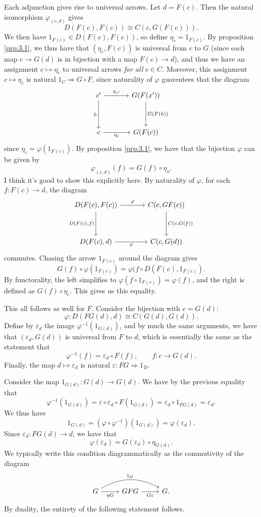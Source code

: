 Each adjunction gives rise to universal arrows. Let $d=F(c)$. Then the natural isomorphism $\varphi_{(c,d)} $ gives
\[
	D(F(c),F(c))\cong C(c,G(F(c)))
.\]
We then have $1_{F(c)} \in D(F(c),F(c))$, so define $\eta_c = 1_{F(c)} $. By proposition \ref{prp:3.1}, we thus have that $(\eta _c,F(c))$ is universal from $c$ to $G$ (since each map $c\to G(d)$ is in bijection with a map $F(c)\to d$), and thus we have an assignment $c\mapsto \eta _c$ to universal arrows \emph{for all} $c\in C$. Moreover, this assignment $c\mapsto \eta _c$ is natural $1_C\Rightarrow G\circ F$, since naturality of $\varphi $ guarentees that the diagram
\[\begin{tikzcd}[row sep = 3.5em, column sep = 3.5em]
c' \ar[" \eta_{c'}  ", r] \ar[" h "', d]  & G(F(x'))\ar[" G(F(h)) ", d]  \\
c\ar[" \eta_c "', r]  & G(F(c))
\end{tikzcd}\]
since $\eta_c = \varphi (1_{F(c)} )$. By proposition \ref{prp:3.1}, we have that the bijection $\varphi $ can be given by
\[
	\varphi_{(c,d)} (f)=G(f)\circ \eta _x
.\]
I think it's good to show this explicitly here. By naturality of $\varphi $, for each $f : F(c) \to d$, the diagram
\[\begin{tikzcd}[row sep = 3.5em, column sep = 3.5em]
D(F(c),F(c))\ar[" \varphi ", r] \ar[" D(F(c)\text{,} f) "', d]  & C(c,GF(c))\ar[" C(c\text{,} G(f)) ", d]  \\
D(F(c),d)\ar[" \varphi  "', r]  & C(c,G(d))
\end{tikzcd}\]
commutes. Chasing the arrow $1_{F(c)} $ around the diagram gives
\[
	G(f)\circ \varphi(1_{F(c)}) =\varphi(f\circ D(F(c),1_{F(c)} )
.\]
By functorality, the left simplifies to $\varphi (f\circ 1_{F(c)} )=\varphi (f)$, and the right is defined as $G(f)\circ \eta_c$. This gives us this equality.

This all follows as well for $F$. Consider the bijection with $c=G(d)$:
\[
	\varphi : D(FG(d),d)\cong C(G(d),G(d))
.\]
Define by $\varepsilon_d$ the image $\varphi ^{-1} (1_{G(d)} )$, and by much the same arguments, we have that $(\varepsilon _d,G(d))$ is universal from $F$ to $d$, which is essentially the same as the statement that
\[
	\varphi ^{-1} (f)=\varepsilon _d \circ F(f),\qquad f : c \to G(d)
.\]
Finally, the map $d\mapsto \varepsilon _d$ is natural $\varepsilon : FG \Rightarrow 1_D$.

Consider the map $1_{G(d)} : G(d) \to G(d)$. We have by the previous equality that
\[
	\varphi ^{-1} (1_{G(d)} )=\varepsilon \circ \varepsilon_d \circ F(1_{G(d)} )=\varepsilon _d\circ 1_{FG(d)} =\varepsilon _d
.\]
We thus have
\[
	1_{G(d)} =(\varphi \circ \varphi ^{-1} )(1_{G(d)} )=\varphi (\varepsilon_d)
.\]
Since $\varepsilon _d : FG(d) \to d$, we have that
\[
	\varphi (\varepsilon _d)=G(\varepsilon _d)\circ \eta_{G(d)} 
.\]
We typically write this condition diagrammatically as the commutivity of the diagram
\[\begin{tikzcd}[row sep = 2.5em, column sep = 2.5em]
G\ar[" \eta G "', r] \ar[" 1_G ", bend left, rr]  & GFG \ar[" G\varepsilon  "', r]  & G.
\end{tikzcd}\]
By duality, the entirety of the following statement follows.

